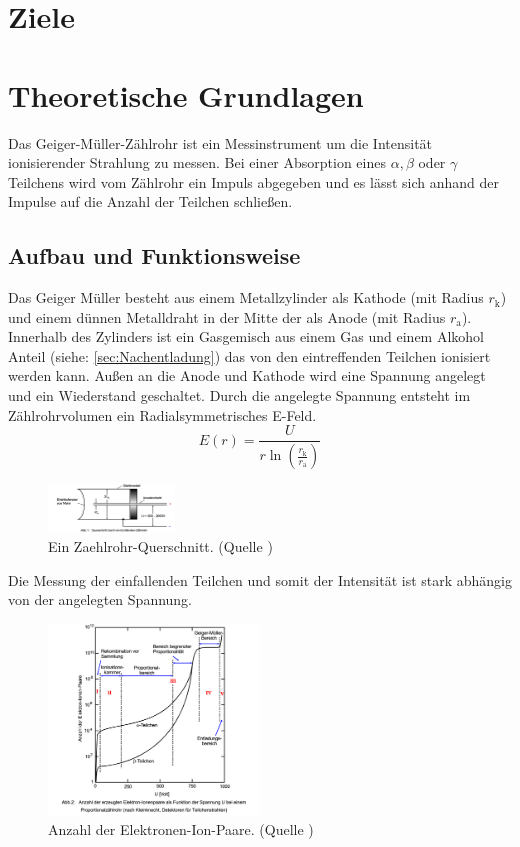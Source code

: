 \section{Ziele}
\label{sec:Ziele}
\section{Theoretische Grundlagen}
\label{sec:Theorie}
Das Geiger-Müller-Zählrohr ist ein Messinstrument um die Intensität ionisierender Strahlung zu messen.
Bei einer Absorption eines $\alpha , \beta$ oder $\gamma$ Teilchens wird vom Zählrohr ein Impuls abgegeben und es lässt sich anhand der Impulse auf die Anzahl der Teilchen schließen.
\subsection{Aufbau und Funktionsweise}
\label{sec:Funktion}
Das Geiger Müller besteht aus einem Metallzylinder als Kathode (mit Radius $r_{\text{k}}$) und einem dünnen Metalldraht in der Mitte der als Anode (mit Radius $r_{\text{a}}$).
Innerhalb des Zylinders ist ein Gasgemisch aus einem Gas und einem Alkohol Anteil (siehe: \ref{sec:Nachentladung}) das von den eintreffenden Teilchen ionisiert werden kann.
Außen an die Anode und Kathode wird eine Spannung angelegt und ein Wiederstand geschaltet.
Durch die angelegte Spannung entsteht im Zählrohrvolumen ein Radialsymmetrisches E-Feld.
\begin{equation}
    E(r) = \frac{U}{r \ln\left(\frac{r_{\text{k}}}{r_{\text{a}}}\right)}
\end{equation}
\begin{figure}
    \centering
    \includegraphics[width=0.3\textwidth]{bilder/Zaehlrohr_Querschnitt.png}
    \caption{Ein Zaehlrohr-Querschnitt. (Quelle \cite{Anleitung})}
    \label{fig:Zaehlrohr}
\end{figure}
Die Messung der einfallenden Teilchen und somit der Intensität ist stark abhängig von der angelegten Spannung.
\begin{figure}
    \centering
    \includegraphics[width=0.5\textwidth]{bilder/Anzahl_der_Elektronen.png}
    \caption{ Anzahl der Elektronen-Ion-Paare. (Quelle \cite{Anleitung})}
    \label{fig:Anzahl_der_Elektronen}
\end{figure}
